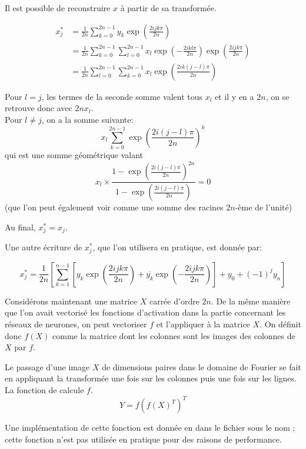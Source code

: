 Il est possible de reconstruire $x$ à partir de sa transformée.

\begin{align*}
x^{*}_j &= \frac{1}{2n} \sum_{k=0}^{2n-1} y_k \exp\left( \frac{2ijk\pi}{2n} \right)  \\
        &= \frac{1}{2n} \sum_{k=0}^{2n-1} \sum_{l = 0}^{2n-1} x_l \exp\left(-\frac{2ikl\pi}{2n}\right) \exp\left( \frac{2ijk\pi}{2n} \right) \\
		&= \frac{1}{2n} \sum_{l=0}^{2n-1} \sum_{k = 0}^{2n-1} x_l \exp\left(\frac{2ik(j-l)\pi}{2n}\right) 
\end{align*}

Pour $l = j$, les termes de la seconde somme valent tous $x_l$ et il y en a 
$2n$, on se retrouve donc avec $2n x_l$. \\
Pour $l \neq j$, on a la somme suivante:
\[
x_l \sum_{k = 0}^{2n-1} \exp\left(\frac{2i(j-l)\pi}{2n}\right)^k 
\]
qui est une somme géométrique valant
\[
x_l \times \frac{1-\exp\left(\frac{2i(j-l)\pi}{2n}\right)^{2n}}{1-\exp\left(\frac{2i(j-l)\pi}{2n}\right)} = 0
\]
(que l'on peut également voir comme une somme des racines $2n$-ème de l'unité)

Au final, $x^{*}_j = x_j$.

Une autre écriture de $x^{*}_j$, que l'on utilisera en pratique, est donnée par:

\[
x^{*}_j = \frac{1}{2n} \left[ \sum_{k=1}^{n-1} \left[ y_k \exp\left( \frac{2ijk\pi}{2n} \right) 
          + \overline{y_k} \exp\left(-\frac{2ijk\pi}{2n} \right) \right]
		  + y_0 + (-1)^{j} y_n \right]
\]


Considérons maintenant une matrice $X$ carrée d'ordre $2n$. 
De la même manière que l'on avait vectorisé les fonctions 
d'activation dans la partie concernant les réseaux de neurones, 
on peut vectoriser $f$ et l'appliquer à la matrice $X$. 
On définit donc $f(X)$ comme la matrice dont les colonnes sont 
les images des colonnes de $X$ par $f$.

Le passage d'une image $X$ de dimensions paires dans le domaine 
de Fourier se fait en appliquant la transformée une fois sur les 
colonnes puis une fois sur les lignes. 
La fonction  de  calcule $f$.
\[
Y = f(f(X)^T)^T
\]

Une implémentation de cette fonction est donnée en \Python dans le 
fichier  sous le nom ; cette 
fonction n'est pas utilisée en pratique pour des raisons de performance.
